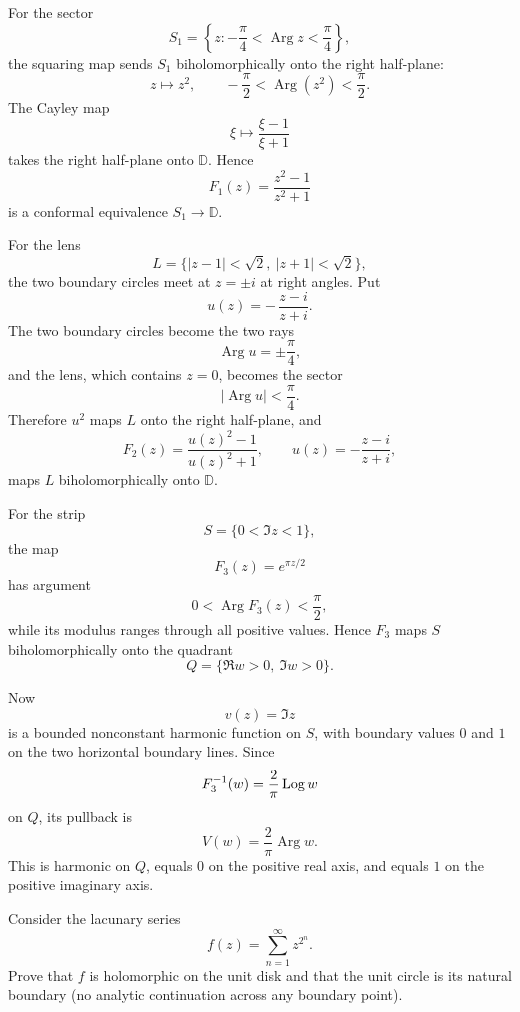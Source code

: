 \begin{solution}
For the sector
\[
S_1=\left\{z:-\frac{\pi}{4}<\operatorname{Arg}z<\frac{\pi}{4}\right\},
\]
the squaring map sends \(S_1\) biholomorphically onto the right half-plane:
\[
z\longmapsto z^2,
\qquad
-\frac{\pi}{2}<\operatorname{Arg}(z^2)<\frac{\pi}{2}.
\]
The Cayley map
\[
\xi\longmapsto\frac{\xi-1}{\xi+1}
\]
takes the right half-plane onto \(\mathbb D\). Hence
\[
\boxed{
F_1(z)=\frac{z^2-1}{z^2+1}
}
\]
is a conformal equivalence \(S_1\to\mathbb D\).

For the lens
\[
L=\{|z-1|<\sqrt2,\ |z+1|<\sqrt2\},
\]
the two boundary circles meet at \(z=\pm i\) at right angles. Put
\[
u(z)=-\,\frac{z-i}{z+i}.
\]
The two boundary circles become the two rays
\[
\operatorname{Arg}u=\pm\frac{\pi}{4},
\]
and the lens, which contains \(z=0\), becomes the sector
\[
|\operatorname{Arg}u|<\frac{\pi}{4}.
\]
Therefore \(u^2\) maps \(L\) onto the right half-plane, and
\[
\boxed{
F_2(z)
=
\frac{u(z)^2-1}{u(z)^2+1},
\qquad
u(z)=-\frac{z-i}{z+i},
}
\]
maps \(L\) biholomorphically onto \(\mathbb D\).

For the strip
\[
S=\{0<\Im z<1\},
\]
the map
\[
\boxed{
F_3(z)=e^{\pi z/2}
}
\]
has argument
\[
0<\operatorname{Arg}F_3(z)<\frac{\pi}{2},
\]
while its modulus ranges through all positive values. Hence \(F_3\) maps \(S\) biholomorphically onto the quadrant
\[
Q=\{\Re w>0,\ \Im w>0\}.
\]

Now
\[
v(z)=\Im z
\]
is a bounded nonconstant harmonic function on \(S\), with boundary values \(0\) and \(1\) on the two horizontal boundary lines. Since
\[
F_3^{-1}(w)=\frac{2}{\pi}\operatorname{Log} w
\]
on \(Q\), its pullback is
\[
\boxed{
V(w)=\frac{2}{\pi}\operatorname{Arg}w.
}
\]
This is harmonic on \(Q\), equals \(0\) on the positive real axis, and equals \(1\) on the positive imaginary axis.
\end{solution}


\begin{problem}[CP-IV-0112]
\label{prob:cp-iv-0112}
Consider the lacunary series
\[
f(z)=\sum_{n=1}^{\infty}z^{2^n}.
\]
Prove that $f$ is holomorphic on the unit disk and that the unit circle
is its natural boundary (no analytic continuation across any boundary point).
\end{problem}

